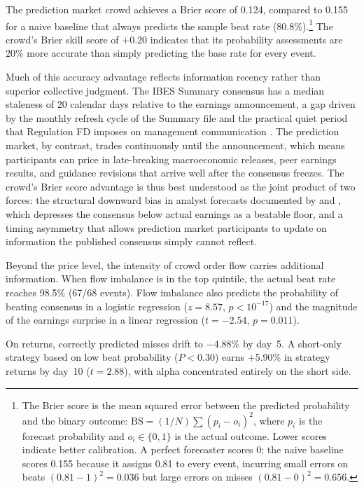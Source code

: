 \documentclass[11pt]{article}
\begin{document}
The prediction market crowd achieves a Brier score of 0.124, compared to 0.155 for a naive baseline that always predicts the sample beat rate (80.8\%).\footnote{The Brier score \citep{brier1950verification} is the mean squared error between the predicted probability and the binary outcome: $\text{BS} = (1/N) \sum (p_i - o_i)^2$, where $p_i$ is the forecast probability and $o_i \in \{0, 1\}$ is the actual outcome. Lower scores indicate better calibration. A perfect forecaster scores 0; the naive baseline scores 0.155 because it assigns 0.81 to every event, incurring small errors on beats $(0.81 - 1)^2 = 0.036$ but large errors on misses $(0.81 - 0)^2 = 0.656$.} The crowd's Brier skill score of $+$0.20 indicates that its probability assessments are 20\% more accurate than simply predicting the base rate for every event.

Much of this accuracy advantage reflects information recency rather than superior collective judgment. The IBES Summary consensus has a median staleness of 20 calendar days relative to the earnings announcement, a gap driven by the monthly refresh cycle of the Summary file and the practical quiet period that Regulation FD imposes on management communication \citep{heflin2003regulation}. The prediction market, by contrast, trades continuously until the announcement, which means participants can price in late-breaking macroeconomic releases, peer earnings results, and guidance revisions that arrive well after the consensus freezes. The crowd's Brier score advantage is thus best understood as the joint product of two forces: the structural downward bias in analyst forecasts documented by \citet{richardson2004walk} and \citet{matsumoto2002management}, which depresses the consensus below actual earnings as a beatable floor, and a timing asymmetry that allows prediction market participants to update on information the published consensus simply cannot reflect.

Beyond the price level, the intensity of crowd order flow carries additional information. When flow imbalance is in the top quintile, the actual beat rate reaches 98.5\% (67/68 events). Flow imbalance also predicts the probability of beating consensus in a logistic regression ($z = 8.57$, $p < 10^{-17}$) and the magnitude of the earnings surprise in a linear regression ($t = -2.54$, $p = 0.011$).

On returns, correctly predicted misses drift to $-$4.88\% by day~5. A short-only strategy based on low beat probability ($P < 0.30$) earns $+$5.90\% in strategy returns by day~10 ($t = 2.88$), with alpha concentrated entirely on the short side.
\end{document}
